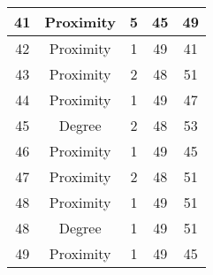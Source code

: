 \documentclass[results.tex]{subfiles}
\begin{document}
\begin{center}
\begin{tabular}{| c || c | c | c | c |}
            \hline
            41                      & Proximity                    & 5                      & 45                      & 49                   \\
            \hline
            42                      & Proximity                    & 1                      & 49                      & 41                   \\
            \hline
            43                      & Proximity                    & 2                      & 48                      & 51                   \\
            \hline
            44                      & Proximity                    & 1                      & 49                      & 47                   \\
            \hline
            45                      & Degree                       & 2                      & 48                      & 53                   \\
            \hline
            46                      & Proximity                    & 1                      & 49                      & 45                   \\
            \hline
            47                      & Proximity                    & 2                      & 48                      & 51                   \\
            \hline
            48                      & Proximity                    & 1                      & 49                      & 51                   \\
            \hline
            48                      & Degree                       & 1                      & 49                      & 51                   \\
            \hline
            49                      & Proximity                    & 1                      & 49                      & 45                   \\
            \hline
        \end{tabular}
    \end{center}
\end{document}
